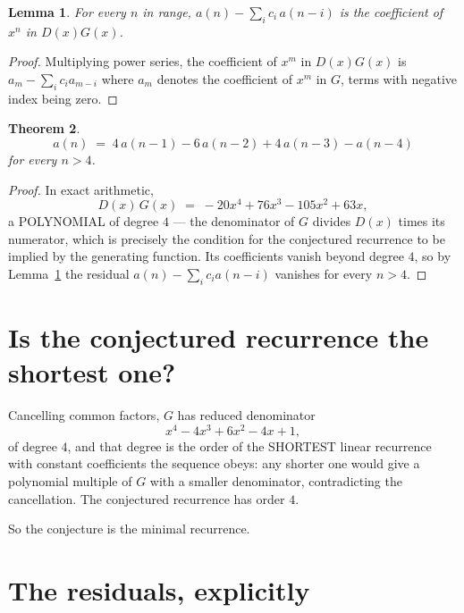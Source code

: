 \documentclass[11pt,a4paper]{article}
\theoremstyle{plain}
\newtheorem{theorem}{Theorem}
\newtheorem{lemma}[theorem]{Lemma}
\theoremstyle{definition}
\begin{document}
\begin{lemma}\label{lem:key}
For every $n$ in range, $a(n)-\sum_i c_i\,a(n-i)$ is the coefficient of $x^{n}$ in
$D(x)G(x)$.
\end{lemma}

\begin{proof}
Multiplying power series, the coefficient of $x^{m}$ in $D(x)G(x)$ is
$a_m-\sum_i c_i a_{m-i}$ where $a_m$ denotes the coefficient of $x^{m}$ in $G$, terms with
negative index being zero.
\end{proof}

\begin{theorem}
\[
a(n)\;=\;4\,a(n-1) - 6\,a(n-2) + 4\,a(n-3) - a(n-4)
\]
for every $n>4$.
\end{theorem}

\begin{proof}
In exact arithmetic,
\[
D(x)\,G(x)\;=\;- 20 x^{4} + 76 x^{3} - 105 x^{2} + 63 x,
\]
a POLYNOMIAL of degree $4$ --- the denominator of $G$ divides $D(x)$ times its numerator,
which is precisely the condition for the conjectured recurrence to be implied by the
generating function. Its coefficients vanish beyond degree $4$, so by
Lemma~\ref{lem:key} the residual $a(n)-\sum_ic_ia(n-i)$ vanishes for every
$n>4$.
\end{proof}

\section{Is the conjectured recurrence the shortest one?}

Cancelling common factors, $G$ has reduced denominator
\[
x^{4} - 4 x^{3} + 6 x^{2} - 4 x + 1,
\]
of degree $4$, and that degree is the order of the SHORTEST linear recurrence with
constant coefficients the sequence obeys: any shorter one would give a polynomial multiple of
$G$ with a smaller denominator, contradicting the cancellation. The conjectured recurrence has
order $4$.

So the conjecture is the minimal recurrence.

\section{The residuals, explicitly}
\end{document}
